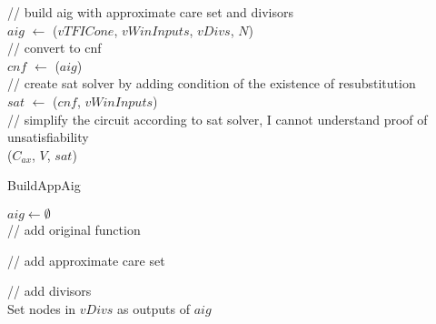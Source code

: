 \documentclass{rpt}
\begin{document}
\begin{algorithm}[H]
\begin{small}
        \vspace{1em}
        // build aig with approximate care set and divisors\\
        $aig$ $\leftarrow$ \BuildAppAig($vTFICone$, $vWinInputs$, $vDivs$, $N$)\\
        // convert to cnf\\
        $cnf$ $\leftarrow$ \AigToCnf($aig$)\\
        // create sat solver by adding condition of the existence of resubstitution\\
        $sat$ $\leftarrow$ \CreateSolver($cnf$, $vWinInputs$)\\

        \vspace{1em}
        // simplify the circuit according to sat solver, I cannot understand proof of unsatisfiability\\
        \ResubNode($C_{ax}$, $V$, $sat$)
    \end{small}
\end{algorithm}

\begin{algorithm}[H]
    \caption{\small BuildAppAig}
    \begin{small}

        \vspace{1em}
        $aig \leftarrow\emptyset$\\
        // add original function\\

        \vspace{1em}
        // add approximate care set\\

        \vspace{1em}
        // add divisors\\
        Set nodes in $vDivs$ as outputs of $aig$

        \vspace{1em}
    \end{small}
\end{algorithm}
\end{document}
